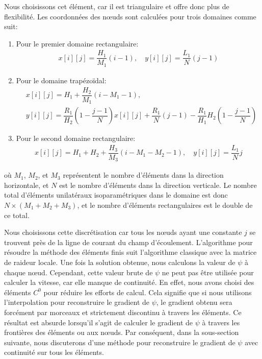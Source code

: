 \documentclass[12pt]{book}
\theoremstyle{bfnote}
\theoremstyle{bfnote}
\begin{document}
Nous choisissons cet élément, car il est triangulaire et offre donc plus de flexibilité. Les coordonnées des nœuds sont calculées pour trois domaines comme suit:
\begin{enumerate}
    \item Pour le premier domaine rectangulaire:
    \begin{align}
        x[i][j] = \dfrac{H_1}{M_1}(i - 1), \quad y[i][j] = \dfrac{L_1}{N}(j - 1)
    \end{align}
    \item Pour le domaine trapézoïdal:
    \begin{equation}
        \begin{aligned}
            & x[i][j] = H_1 + \dfrac{H_2}{M_1}(i - M_1 - 1), \\
            & y[i][j] = \dfrac{R_1}{H_2} \left( 1 - \dfrac{j - 1}{N} \right) x[i][j] + \dfrac{R_1}{N}(j - 1) - \dfrac{R_1}{H_1} H_2 \left( 1 - \dfrac{j - 1}{N} \right)
        \end{aligned}
    \end{equation}
    \item Pour le second domaine rectangulaire:
    \begin{align}
        x[i][j] = H_1 + H_2 + \dfrac{H_3}{M_3}(i - M_1 - M_2 - 1), \quad y[i][j] = \dfrac{L_1}{N}j
    \end{align}
\end{enumerate}
où $M_1$, $M_2$, et $M_3$ représentent le nombre d'éléments dans la direction horizontale, et $N$ est le nombre d'éléments dans la direction verticale. Le nombre total d'éléments unilatéraux isoparamétriques dans le domaine est donc $N \times (M_1 + M_2 + M_3)$, et le nombre d'éléments rectangulaires est le double de ce total.

Nous choisissons cette discrétisation car tous les nœuds ayant une constante $j$ se trouvent près de la ligne de courant du champ d'écoulement. L'algorithme pour résoudre la méthode des éléments finis suit l'algorithme classique avec la matrice de raideur locale. Une fois la solution obtenue, nous calculons la valeur de $\psi$ à chaque nœud. Cependant, cette valeur brute de $\psi$ ne peut pas être utilisée pour calculer la vitesse, car elle manque de continuité. En effet, nous avons choisi des éléments $C^0$ pour réduire les efforts de calcul. Cela signifie que si nous utilisons l'interpolation pour reconstruire le gradient de $\psi$, le gradient obtenu sera forcément par morceaux et strictement discontinu à travers les éléments. Ce résultat est absurde lorsqu'il s'agit de calculer le gradient de $\psi$ à travers les frontières des éléments ou aux nœuds. Par conséquent, dans la sous-section suivante, nous discuterons d'une méthode pour reconstruire le gradient de $\psi$ avec continuité sur tous les éléments.
\end{document}
